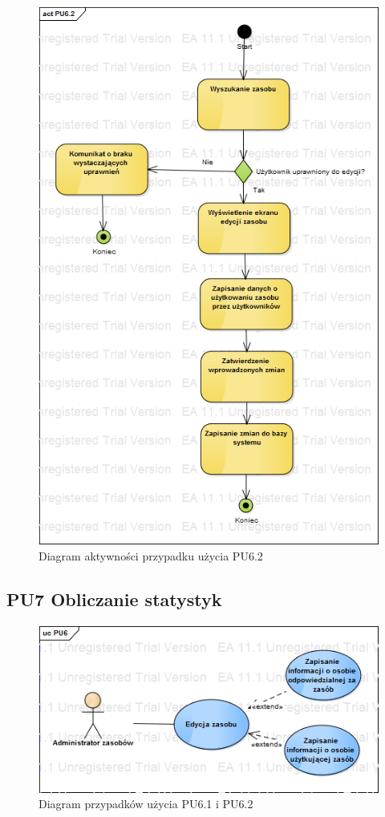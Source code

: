 \begin{figure}[h!]
	\centering
	\includegraphics[scale=0.6]{img/diagrams/activityDiagrams/PU62}
	\caption{Diagram aktywności przypadku użycia PU6.2 \label{fig:labelADPU6.2}}
\end{figure}

\subsection{PU7 Obliczanie statystyk} \label{pu7}
\begin{figure}[h!]
	\centering
	\includegraphics[scale=0.6]{img/diagrams/useCaseDiagrams/PU6.png}
	\caption{Diagram przypadków użycia PU6.1 i PU6.2 \label{fig:labelUCPU6}}
\end{figure}

